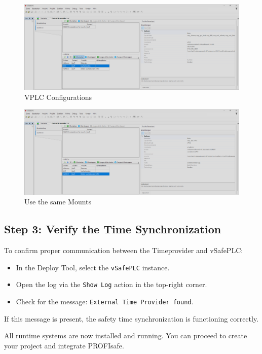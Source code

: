 \documentclass[a4paper,12pt]{article}
\begin{document}
\begin{figure}[H]
	\centering
	\includegraphics[width=1\textwidth]{7.PNG}
	\caption{VPLC Configurations}
\end{figure}

\begin{figure}[H]
	\centering
	\includegraphics[width=1\textwidth]{8.PNG}
	\caption{Use the same Mounts}
\end{figure}

\subsection*{Step 3: Verify the Time Synchronization}

To confirm proper communication between the Timeprovider and vSafePLC:

\begin{itemize}
	\item In the Deploy Tool, select the \texttt{vSafePLC} instance.
	\item Open the log via the \texttt{Show Log} action in the top-right corner.
	\item Check for the message: \texttt{External Time Provider found}.
\end{itemize}

If this message is present, the safety time synchronization is functioning correctly.

\vspace{0.5em}
All runtime systems are now installed and running. You can proceed to create your project and integrate PROFIsafe.
\end{document}
